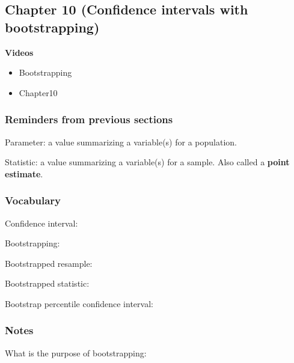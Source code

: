 \documentclass[
]{report}
\providecommand{\tightlist}{%
  \setlength{\itemsep}{0pt}\setlength{\parskip}{0pt}}
\newcommand{\rgs}{\vspace{12pt}} %
\begin{document}
\hypertarget{chapter-10-confidence-intervals-with-bootstrapping}{%
\subsection*{Chapter 10 (Confidence intervals with bootstrapping)}\label{chapter-10-confidence-intervals-with-bootstrapping}}


\textbf{Videos}

\begin{itemize}
\tightlist
\item
  Bootstrapping
\item
  Chapter10
\end{itemize}

\hypertarget{reminders-from-previous-sections-1}{%
\subsubsection*{Reminders from previous sections}\label{reminders-from-previous-sections-1}}

Parameter: a value summarizing a variable(s) for a population.

Statistic: a value summarizing a variable(s) for a sample. Also called a \textbf{point estimate}.

\hypertarget{vocabulary-10}{%
\subsubsection*{Vocabulary}\label{vocabulary-10}}

Confidence interval:
\rgs

Bootstrapping:
\rgs

Bootstrapped resample:
\rgs

Bootstrapped statistic:
\rgs

Bootstrap percentile confidence interval:
\rgs

\hypertarget{notes-14}{%
\subsubsection*{Notes}\label{notes-14}}

What is the purpose of bootstrapping:
\rgs
\end{document}
